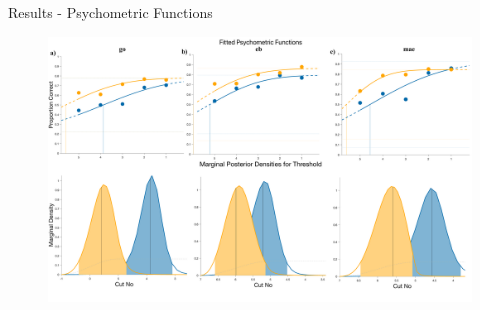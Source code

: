 \documentclass[10pt,xcolor=svgnames]{beamer} %
\begin{document}
\begin{frame}{Results - Psychometric Functions}
    \begin{figure}        
        \hspace*{-0.4cm} 
        \centering
        \includegraphics[width = 1.1\textwidth]{results/test_psych.png}    \label{fig:psych_fit}
    \end{figure}
\end{frame}
\end{document}
